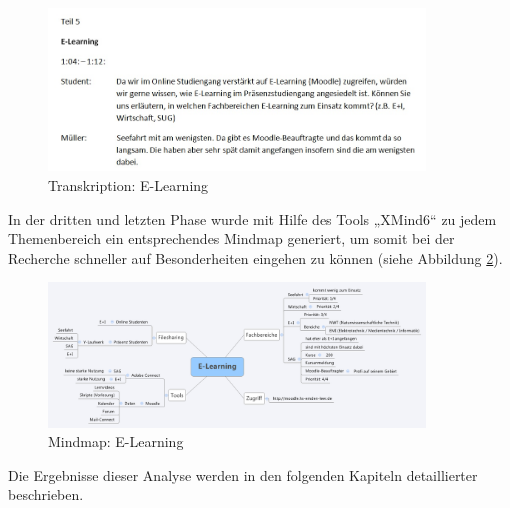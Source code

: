 \begin{figure}[h!]
	\centering
	\includegraphics[width=10cm]{kapitel/gruppe2/bilder/E-Learning_Transkription}
	\caption{Transkription: E-Learning}
	\label{fig_E-Learning_Transkription}
\end{figure}

In der dritten und letzten Phase wurde mit Hilfe des Tools „XMind6“ zu jedem Themenbereich ein entsprechendes Mindmap generiert, um somit bei der Recherche schneller auf Besonderheiten eingehen zu können  (siehe Abbildung \ref{fig_E-Learning_MM}).

\begin{figure}[h!]
	\centering
	\includegraphics[width=10cm]{kapitel/gruppe2/bilder/E-Learning_MM}
	\caption{Mindmap: E-Learning}
	\label{fig_E-Learning_MM}
\end{figure}

Die Ergebnisse dieser Analyse werden in den folgenden Kapiteln detaillierter beschrieben. 
